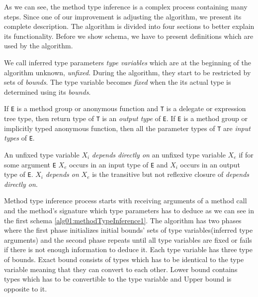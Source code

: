 \par
As we can see, the method type inference is a complex process containing many steps.
Since one of our improvement is adjusting the algorithm, we present its complete description.
The algorithm is divided into four sections to better explain its functionality.
Before we show schema, we have to present definitions which are used by the algorithm.
\par
{}
\begin{defn}
We call inferred type parameters \emph{type variables} which are at the beginning of the algorithm unknown, \emph{unfixed}. 
During the algorithm, they start to be restricted by sets of \emph{bounds}.
The type variable becomes \emph{fixed} when the its actual type is determined using its \emph{bounds}.
\end{defn}
\begin{defn}
If \texttt{E} is a method group or anonymous function and \texttt{T} is a delegate or expression tree type, then return type of \texttt{T} is an \emph{output type} of \texttt{E}.
If \texttt{E} is a method group or implicitly typed anonymous function, then all the parameter types of \texttt{T} are \emph{input types} of \texttt{E}. 
\end{defn}
\par
\begin{defn}[Dependence]
An unfixed type variable \texttt{$X_i$} \emph{depends directly on} an unfixed type variable \texttt{$X_e$} if for some argument \texttt{E} \texttt{$X_e$} occurs in an input type of \texttt{E} and \texttt{$X_i$} occurs in an output type of \texttt{E}.
\texttt{$X_i$} \emph{depends on} \texttt{$X_e$} is the transitive but not reflexive closure of \emph{depends directly on}.
\end{defn}
\par
{}
Method type inference process starts with receiving arguments of a method call and the method's signature which type parameters has to deduce as we can see in the first schema \ref{alg01:methodTypeInference1}.
The algorithm has two phases where the first phase initializes initial bounds' sets of type variables(inferred type arguments) and the second phase repeats until all type variables are fixed or fails if there is not enough information to deduce it.
Each type variable has three type of bounds. 
Exact bound consists of types which has to be identical to the type variable meaning that they can convert to each other.
Lower bound contains types which has to be convertible to the type variable and Upper bound is opposite to it.
